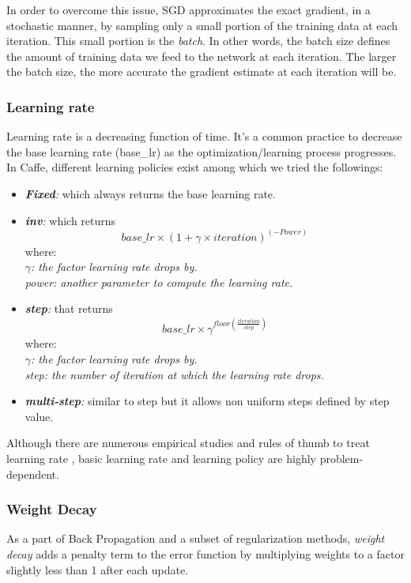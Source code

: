\indent In order to overcome this issue, SGD approximates the exact gradient, in a stochastic manner, by sampling only a small portion of the training data at each iteration. This small portion is the \textit{batch}. In other words, the batch size defines the amount of training data we feed to the network at each iteration. The larger the batch size, the more accurate the gradient estimate at each iteration will be. 

\subsubsection{Learning rate}
\label{learning rate}
Learning rate is a decreasing function of time. It's a common practice to decrease the base learning rate (base\_lr) as the optimization/learning process progresses. In Caffe, different learning policies exist among which we tried the followings:
\begin{itemize}
\item \textit{\textbf{Fixed}:} which always returns the base learning rate.

\item \textit{\textbf{inv}:} which returns $$base\_lr \times (1 + \gamma \times iteration) ^ {(-Power)}$$ where:\\\textit{ $\gamma$: the factor learning rate drops by.}\\\textit{power: another parameter to compute the learning rate.}

\item \textit{\textbf{step}:} that returns $$base\_lr \times \gamma ^ {floor(\frac{iteration}{step})}$$ where:\\ \textit{$\gamma$: the factor learning rate drops by.}\\\textit{step: the number of iteration at which the learning rate drops.} 
\item \textit{\textbf{multi-step}:} similar to step but it allows non uniform steps defined by step value.
\end{itemize}
Although there are numerous empirical studies and rules of thumb to treat learning rate \cite{senior2013empirical,yu1995dynamic,minai1990acceleration}, basic learning rate and learning policy are highly problem-dependent.  

\subsubsection{Weight Decay}


As a part of Back Propagation and a subset of regularization methods, \textit{weight decay} adds a penalty term to the error function by multiplying weights to a factor slightly less than 1 after each update. 

